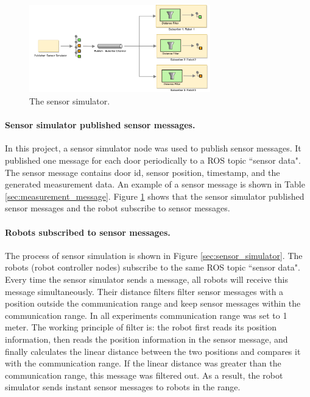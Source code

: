 \begin{figure}
\centering
\includegraphics[width = 0.7\textwidth]{content/images/ch4/sensor_simulator.drawio.png}
\caption{The sensor simulator.}
\label{fig:sensor_simulator}
\end{figure}

\paragraph{Sensor simulator published sensor messages.}
In this project, a sensor simulator node was used to publish sensor messages. It published one message for each door periodically to a ROS topic ``sensor data". The sensor message contains door id, sensor position, timestamp, and the generated measurement data. An example of a sensor message is shown in Table  \ref{sec:measurement_message}. 
Figure \ref{fig:sensor_simulator} shows that the sensor simulator published sensor messages and the robot subscribe to sensor messages.

\paragraph{Robots subscribed to sensor messages. }
The process of sensor simulation is shown in Figure \ref{sec:sensor_simulator}. The robots (robot controller nodes) subscribe to the same ROS topic ``sensor data". Every time the sensor simulator sends a message, all robots will receive this message simultaneously. Their distance filters filter sensor messages with a position outside the communication range and keep sensor messages within the communication range. In all experiments communication range was set to 1 meter.  The working principle of filter is: the robot first reads its position information, then reads the position information in the sensor message, and finally calculates the linear distance between the two positions and compares it with the communication range. If the linear distance was greater than the communication range, this message was filtered out. 
As a result, the robot simulator sends instant sensor messages to robots in the range. 

